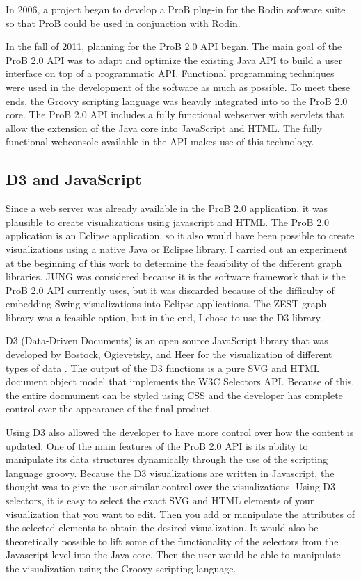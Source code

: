 In 2006, a project began to develop a ProB plug-in for the Rodin software suite so that ProB could be used in conjunction with Rodin. 

In the fall of 2011, planning for the ProB 2.0 API began.  The main goal of the ProB 2.0 API was to adapt and optimize the existing Java API to build a user interface on top of a programmatic API. Functional programming techniques were used in the development of the software as much as possible. To meet these ends, the Groovy scripting language was heavily integrated into to the ProB 2.0 core. The ProB 2.0 API includes a fully functional webserver with servlets that allow the extension of the Java core into JavaScript and HTML. The fully functional webconsole available in the API makes use of this technology.

\subsection{D3 and JavaScript}

Since a web server was already available in the ProB 2.0 application, it was plausible to create visualizations using javascript and HTML. The ProB 2.0 application is an Eclipse application, so it also would have been possible to create visualizations using a native Java or Eclipse library. I carried out an experiment at the beginning of this work to determine the feasibility of the different graph libraries. JUNG was considered because it is the software framework that is the ProB 2.0 API currently uses, but it was discarded because of the difficulty of embedding Swing visualizations into Eclipse applications. The ZEST graph library was a feasible option, but in the end, I chose to use the D3 library. 

D3 (Data-Driven Documents) is an open source JavaScript library that was developed by Bostock, Ogievetsky, and Heer for the visualization of different types of data \cite{2011-d3}. The output of the D3 functions is a pure SVG and HTML document object model that implements the W3C Selectors API. Because of this, the entire docmument can be styled using CSS and the developer has complete control over the appearance of the final product. 

Using D3 also allowed the developer to have more control over how the content is updated. One of the main features of the ProB 2.0 API is its ability to manipulate its data structures dynamically through the use of the scripting language groovy. Because the D3 visualizations are written in Javascript, the thought was to give the user similar control over the visualizations. Using D3 selectors, it is easy to select the exact SVG and HTML elements of your visualization that you want to edit. Then you add or manipulate the attributes of the selected elements to obtain the desired visualization. It would also be theoretically possible to lift some of the functionality of the selectors from the Javascript level into the Java core. Then the user would be able to manipulate the visualization using the Groovy scripting language.

